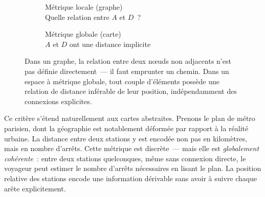 \usetikzlibrary{calc}
\begin{figure}[ht]
  \centering
  \begin{subfigure}
    [b]{0.44\textwidth}
    \centering
    \caption{Métrique locale (graphe)\\
    {\footnotesize Quelle relation entre $A$ et $D$~?}}
  \end{subfigure}
  \hfill
  \begin{subfigure}
    [b]{0.44\textwidth}
    \centering
    \caption{Métrique globale (carte)\\
    {\footnotesize $A$ et $D$ ont une distance implicite}}
  \end{subfigure}
  \caption{Dans un graphe, la relation entre deux nœuds non adjacents n'est pas définie
  directement~--- il faut emprunter un chemin. Dans un espace à métrique globale,
  tout couple d'éléments possède une relation de distance inférable de leur position,
  indépendamment des connexions explicites.}
  \label{fig:metrique_locale_globale}
\end{figure}

Ce critère s'étend naturellement aux cartes abstraites. Prenons le plan de métro
parisien, dont la géographie est notablement déformée par rapport à la réalité urbaine.
La distance entre deux stations y est encodée non pas en kilomètres, mais en nombre
d'arrêts. Cette métrique est discrète~--- mais elle est \emph{globalement
cohérente}~: entre deux stations quelconques, même sans connexion directe, le voyageur
peut estimer le nombre d'arrêts nécessaires en lisant le plan. La position
relative des stations encode une information dérivable sans avoir à suivre
chaque arête explicitement.

